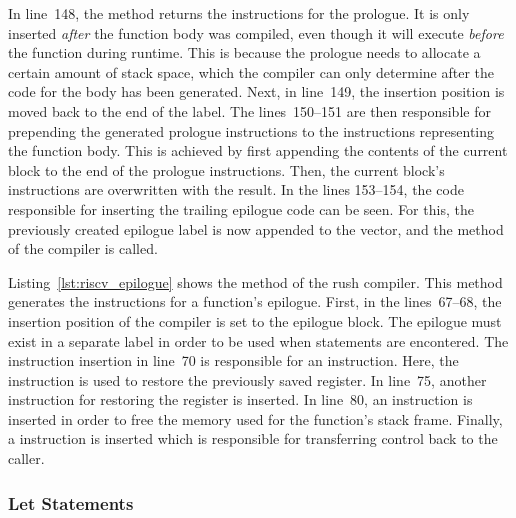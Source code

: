 In line~148, the  method returns the instructions for the prologue.
It is only inserted \emph{after} the function body was compiled, even though it will execute \emph{before} the function during runtime.
This is because the prologue needs to allocate a certain amount of stack space, which the compiler can only determine after the code for the body has been generated.
Next, in line~149, the insertion position is moved back to the end of the  label.
The lines~150--151 are then responsible for prepending the generated prologue instructions to the instructions representing the function body.
This is achieved by first appending the contents of the current block to the end of the prologue instructions.
Then, the current block's instructions are overwritten with the result.
In the lines 153--154, the code responsible for inserting the trailing epilogue code can be seen.
For this, the previously created epilogue label is now appended to the  vector, and the  method of the compiler is called.


Listing~\ref{lst:riscv_epilogue} shows the  method of the rush \riscv{} compiler.
This method generates the instructions for a function's epilogue.
First, in the lines~67--68, the insertion position of the compiler is set to the epilogue block.
The epilogue must exist in a separate label in order to be used when  statements are encontered.
The instruction insertion in line~70 is responsible for an  instruction.
Here, the  instruction is used to restore the previously saved  register.
In line~75, another  instruction for restoring the  register is inserted.
In line~80, an  instruction is inserted in order to free the memory used for the function's stack frame.
Finally, a  instruction is inserted which is responsible for transferring control back to the caller.

\subsubsection{Let Statements}

